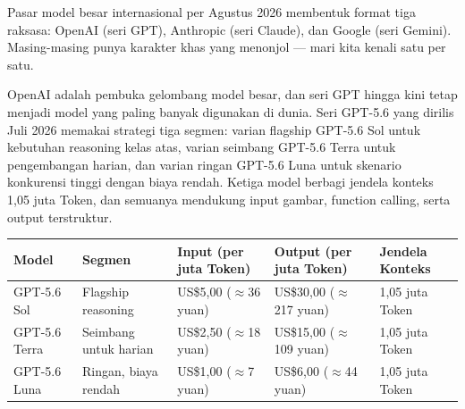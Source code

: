 


Pasar model besar internasional per Agustus 2026 membentuk format tiga raksasa: OpenAI (seri GPT), Anthropic (seri Claude), dan Google (seri Gemini). Masing-masing punya karakter khas yang menonjol — mari kita kenali satu per satu.


OpenAI adalah pembuka gelombang model besar, dan seri GPT hingga kini tetap menjadi model yang paling banyak digunakan di dunia. Seri GPT-5.6 yang dirilis Juli 2026 memakai strategi tiga segmen: varian flagship GPT-5.6 Sol untuk kebutuhan reasoning kelas atas, varian seimbang GPT-5.6 Terra untuk pengembangan harian, dan varian ringan GPT-5.6 Luna untuk skenario konkurensi tinggi dengan biaya rendah. Ketiga model berbagi jendela konteks 1,05 juta Token, dan semuanya mendukung input gambar, function calling, serta output terstruktur.

\begin{center}
\begin{tabularx}{\linewidth}{|X|X|X|X|X|}
\hline
\textbf{Model} & \textbf{Segmen} & \textbf{Input (per juta Token)} & \textbf{Output (per juta Token)} & \textbf{Jendela Konteks} \tabularnewline
\hline
GPT-5.6 Sol & Flagship reasoning & US\$5,00 ($\approx$36 yuan) & US\$30,00 ($\approx$217 yuan) & 1,05 juta Token \tabularnewline
GPT-5.6 Terra & Seimbang untuk harian & US\$2,50 ($\approx$18 yuan) & US\$15,00 ($\approx$109 yuan) & 1,05 juta Token \tabularnewline
GPT-5.6 Luna & Ringan, biaya rendah & US\$1,00 ($\approx$7 yuan) & US\$6,00 ($\approx$44 yuan) & 1,05 juta Token \tabularnewline
\hline
\end{tabularx}
\end{center}

